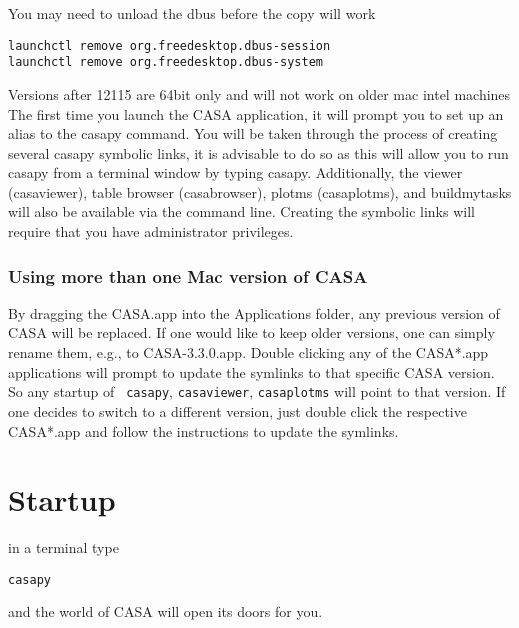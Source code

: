 You may need to unload the dbus before the copy will work

\small
\begin{verbatim}
launchctl remove org.freedesktop.dbus-session
launchctl remove org.freedesktop.dbus-system
\end{verbatim}
\normalsize

Versions after 12115 are 64bit only and will not work on older mac
intel machines The first time you launch the CASA application, it will
prompt you to set up an alias to the casapy command. You will be taken
through the process of creating several casapy symbolic links, it is
advisable to do so as this will allow you to run casapy from a
terminal window by typing casapy. Additionally, the viewer
(casaviewer), table browser (casabrowser), plotms (casaplotms), and
buildmytasks will also be available via the command line. Creating the
symbolic links will require that you have administrator privileges.


\subsubsection{Using more than one Mac version of CASA}
By dragging the CASA.app into the Applications folder, any previous
version of CASA will be replaced. If one would like to keep older
versions, one can simply rename them, e.g., to CASA-3.3.0.app. Double
clicking any of the CASA*.app applications will prompt to update the
symlinks to that specific CASA version. So any startup of {\tt
  casapy}, {\tt casaviewer}, {\tt casaplotms} will point to that
version. If one decides to switch to a different version, just double
click the respective CASA*.app and follow the instructions to update
the symlinks.



\section{Startup}
\label{section:install.startup}

in a terminal type\\
\small
\begin{verbatim}
casapy
\end{verbatim}
\normalsize

and the world of CASA will open its doors for you. 

